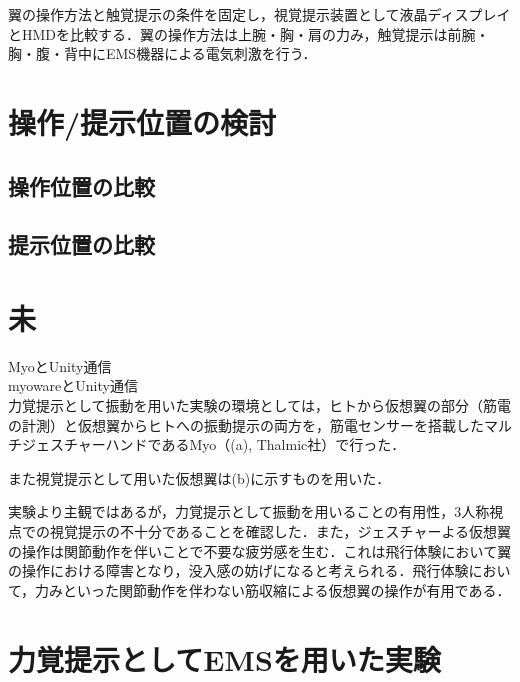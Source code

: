         翼の操作方法と触覚提示の条件を固定し，視覚提示装置として液晶ディスプレイとHMDを比較する．翼の操作方法は上腕・胸・肩の力み，触覚提示は前腕・胸・腹・背中にEMS機器による電気刺激を行う．

    
\section{操作/提示位置の検討}
    \subsection{操作位置の比較}
    \subsection{提示位置の比較}

\section{未}
    
        MyoとUnity通信\\
        myowareとUnity通信\\
    
    

    力覚提示として振動を用いた実験の環境としては，ヒトから仮想翼の部分（筋電の計測）と仮想翼からヒトへの振動提示の両方を，筋電センサーを搭載したマルチジェスチャーハンドであるMyo（(a), Thalmic社）で行った．

    また視覚提示として用いた仮想翼は(b)に示すものを用いた．

    

    


    

    実験より主観ではあるが，力覚提示として振動を用いることの有用性，3人称視点での視覚提示の不十分であることを確認した．また，ジェスチャーよる仮想翼の操作は関節動作を伴いことで不要な疲労感を生む．これは飛行体験において翼の操作における障害となり，没入感の妨げになると考えられる．飛行体験において，力みといった関節動作を伴わない筋収縮による仮想翼の操作が有用である．

    \section{力覚提示としてEMSを用いた実験}

